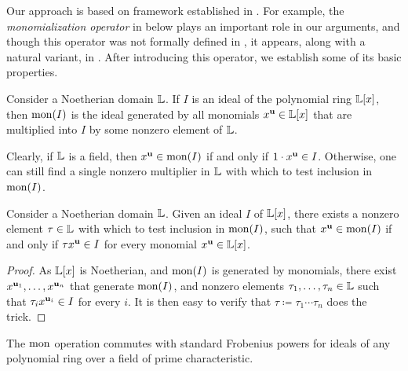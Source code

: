 \documentclass{amsart}
\begin{document}
Our approach is based on framework established in \cite[Appendix]{budur+mustata+saito.roots_bs_polys_monomial}.  For example, the \emph{monomialization operator} in  below plays an important role in our arguments, and though this operator was not formally defined in \loccit, it appears, along with a natural variant, in \cite[Proposition 6.1 and Lemma 6.2]{budur+mustata+saito.roots_bs_polys_monomial}.  After introducing this operator, we establish some of its basic properties.

\begin{definition}
\label{monomialization: D}
Consider a Noetherian domain $\mathbb{L}$.  If $I$ is an ideal of the polynomial ring $\mathbb{L}[x]$, then $\operatorname{mon}(I)$ is the ideal generated by all monomials $x^{\mathbf{u}} \in \mathbb{L}[x]$ that are multiplied into $I$ by some nonzero element of $\mathbb{L}$.
\end{definition}

Clearly, if $\mathbb{L}$ is a field, then $x^{\mathbf{u}} \in \operatorname{mon}(I)$ if and only if $1 \cdot x^{\mathbf{u}} \in I$.  Otherwise, one can still find a single nonzero multiplier in $\mathbb{L}$ with which to test inclusion in $\operatorname{mon}(I)$.  

\begin{lemma}
\label{single multiplier: L}
  Consider a Noetherian domain $\mathbb{L}$.  Given an ideal $I$ of $\mathbb{L}[x]$, there exists a nonzero element $\tau \in \mathbb{L}$ with which to test inclusion in $\operatorname{mon}(I)$, \ie such that $x^{\mathbf{u}} \in \operatorname{mon}(I)$ if and only if $\tau x^{\mathbf{u}} \in I$ for every monomial $x^{\mathbf{u}} \in \mathbb{L}[x]$.
\end{lemma}

\begin{proof}  As $\mathbb{L}[x]$ is Noetherian, and $\operatorname{mon}(I)$ is generated by monomials, there exist $x^{\mathbf{u}_1}, \ldots, x^{\mathbf{u}_n}$ that generate $\operatorname{mon}(I)$, and nonzero elements $\tau_1, \ldots, \tau_n \in \mathbb{L}$ such that $\tau_i x^{\mathbf{u}_i} \in I$ for every $i$.  It is then easy to verify that $\tau\coloneqq \tau_1 \cdots \tau_n$ does the trick.
\end{proof}

\begin{lemma} 
\label{frobenius-powers+mon-commute: L}
The $\operatorname{mon}$ operation commutes with standard Frobenius powers for ideals of any polynomial ring over a field of prime characteristic. %
\end{lemma}
\end{document}

